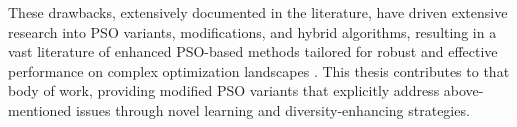 {These drawbacks, extensively documented in the literature, have driven extensive research into PSO variants, modifications, and hybrid algorithms, resulting in a vast literature of enhanced PSO-based methods tailored for robust and effective performance on complex optimization landscapes \citep[see,][]{thangaraj2011particle,zhang2015comprehensive,sengupta2019particle,jain2022Overview,minku2023introduction,abualigah2025particle,chauhan2025learning,urbanczyk2025sequential}. This thesis contributes to that body of work, providing modified PSO variants that explicitly address above-mentioned issues through novel learning and diversity-enhancing strategies.















}
